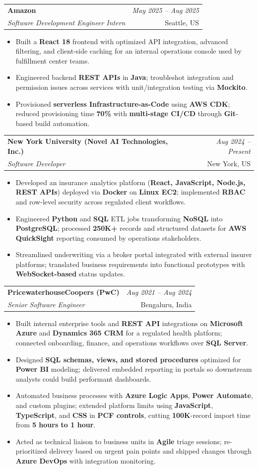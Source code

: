 \documentclass[a4paper,10pt]{article}
\makeatletter
\newcommand{\resumeSubheading}[4]{
\vspace{0.3mm}\item
    \begin{tabular*}{0.98\textwidth}[t]{l@{\extracolsep{\fill}}r}
        \textbf{#1} & \textit{\footnotesize{#4}} \\
        \textit{\footnotesize{#3}} & \footnotesize{#2}\\
    \end{tabular*}\vspace{-2mm}
}
\newcommand{\resumeItemListStart}{\begin{itemize}[leftmargin=*, labelsep=1mm, itemsep=0pt]}
\newcommand{\resumeItemListEnd}{\end{itemize}\vspace{-2mm}}
\makeatother
\begin{document}
\resumeSubheading
{Amazon}{Seattle, US}
{Software Development Engineer Intern}{May 2025 -- Aug 2025}
\resumeItemListStart
\item \footnotesize{Built a \textbf{React 18} frontend with optimized API integration, advanced filtering, and client-side caching for an internal operations console used by fulfillment center teams.}
\item \footnotesize{Engineered backend \textbf{REST APIs} in \textbf{Java}; troubleshot integration and permission issues across services with unit/integration testing via \textbf{Mockito}.}
\item \footnotesize{Provisioned \textbf{serverless Infrastructure-as-Code} using \textbf{AWS CDK}; reduced provisioning time \textbf{70\%} with \textbf{multi-stage CI/CD} through \textbf{Git}-based build automation.}
\resumeItemListEnd

\resumeSubheading
{New York University (Novel AI Technologies, Inc.)}{New York, US}
{Software Developer}{Aug 2024 -- Present}
\resumeItemListStart
\item \footnotesize{Developed an insurance analytics platform (\textbf{React, JavaScript, Node.js, REST APIs}) deployed via \textbf{Docker} on \textbf{Linux EC2}; implemented \textbf{RBAC} and row-level security across regulated client workflows.}
\item \footnotesize{Engineered \textbf{Python} and \textbf{SQL} ETL jobs transforming \textbf{NoSQL} into \textbf{PostgreSQL}; processed \textbf{250K+} records and structured datasets for \textbf{AWS QuickSight} reporting consumed by operations stakeholders.}
\item \footnotesize{Streamlined underwriting via a broker portal integrated with external insurer platforms; translated business requirements into functional prototypes with \textbf{WebSocket-based} status updates.}
\resumeItemListEnd

\resumeSubheading
{PricewaterhouseCoopers (PwC)}{Bengaluru, India}
{Senior Software Engineer}{Aug 2021 -- Aug 2024}
\resumeItemListStart
\item \footnotesize{Built internal enterprise tools and \textbf{REST API} integrations on \textbf{Microsoft Azure} and \textbf{Dynamics 365 CRM} for a regulated health platform; connected onboarding, finance, and operations workflows over \textbf{SQL Server}.}
\item \footnotesize{Designed \textbf{SQL schemas, views, and stored procedures} optimized for \textbf{Power BI} modeling; delivered embedded reporting in portals so downstream analysts could build performant dashboards.}
\item \footnotesize{Automated business processes with \textbf{Azure Logic Apps}, \textbf{Power Automate}, and custom plugins; extended platform limits using \textbf{JavaScript}, \textbf{TypeScript}, and \textbf{CSS} in \textbf{PCF controls}, cutting \textbf{100K}-record import time from \textbf{5 hours to 1 hour}.}
\item \footnotesize{Acted as technical liaison to business units in \textbf{Agile} triage sessions; re-prioritized delivery based on urgent pain points and shipped changes through \textbf{Azure DevOps} with integration monitoring.}
\resumeItemListEnd
\end{document}
